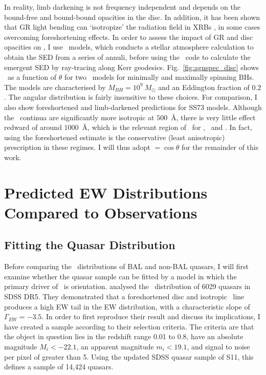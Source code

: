\noindent
In reality, limb darkening is not frequency independent and 
depends on the bound-free and bound-bound opacities in the disc.
In addition, it has been shown that GR light bending can `isotropize' the radiation
field in XRBs \citep{zhang1997,munozdarias2013}, in some cases overcoming
foreshortening effects. In order to assess the impact of GR and disc opacities
on \ept, I use \agn\ models, which conducts a stellar atmosphere calculation\index{\agn}
to obtain the SED from a series of annuli, before using the \kerrtrans\ code \citep{agol1997}
to calculate the emergent SED by ray-tracing along Kerr geodesics.
Fig.~\ref{fig:agnspec_disc} shows \ept\ as a function of 
$\theta$ for two \agn\ models for minimally and maximally spinning BHs. 
The models are characterised by $M_{BH}=10^9~M_\odot$ and an Eddington fraction of $0.2$.
The angular distribution is fairly insensitive to these choices.
For comparison, I also show foreshortened and limb-darkened predictions for SS73 models.
Although the \agn\ continua are significantly more isotropic at $500$~\AA,
there is very little effect redward of around $1000$~\AA, which is the relevant
region of \ept\ for \oiiifull, \civline\ and \mgline . 
In fact, using the foreshortened estimate is the conservative (least anisotropic) prescription 
in these regimes. I will thus adopt \ept$=\cos \theta$ for the remainder of this work.










\section{Predicted EW Distributions Compared to Observations}
\label{sec:mc_angular}

\subsection{Fitting the Quasar Distribution}
\label{sec:fitting}

Before comparing the \ewo\ distributions of BAL and non-BAL quasars,
I will first examine whether the quasar sample can be fitted by a model
in which the primary driver of \ewo\ is orientation.
\citet[][hereafter R11]{risaliti2011} analysed the \ewo\ 
distribution of 6029 quasars in SDSS DR5. They demonstrated
that a foreshortened disc and isotropic \oiiifull\ line produces
a high EW tail in the EW distribution, with a characteristic 
slope of $\Gamma_{EW}=-3.5$. In order to first reproduce their
result and discuss its implications, I have 
created a sample according to their selection
criteria. The criteria are that the object in question lies in the redshift
range 0.01 to 0.8, have an absolute magnitude $M_i<-22.1$, an 
apparent magnitude $m_i<19.1$, and signal to noise per pixel of greater
than 5. Using the updated SDSS quasar sample of S11, this defines
a sample of 14,424 quasars.\index{quasar}\index{SDSS}

